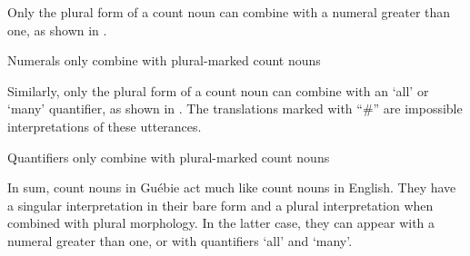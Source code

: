\documentclass[output=paper,colorlinks,citecolor=brown]{langscibook}
\begin{document}
Only the plural form of a count noun can combine with a numeral greater than one, as shown in .\largerpage[-1.75]

\ea%
    \label{ex:sande:4}
    Numerals only combine with plural-marked count nouns
    \z
\z

Similarly, only the plural form of a count noun can combine with an `all' or  `many' quantifier, as shown in . The translations marked with “\#” are impossible interpretations of these utterances.

\ea%
    \label{ex:sande:5}
    Quantifiers only combine with plural-marked count nouns
    \z
\z

In sum, count nouns in Guébie act much like count nouns in English. They have a singular interpretation in their bare form and a plural interpretation when combined with plural morphology. In the latter case, they can appear with a numeral greater than one, or with quantifiers `all' and `many'.
\end{document}

